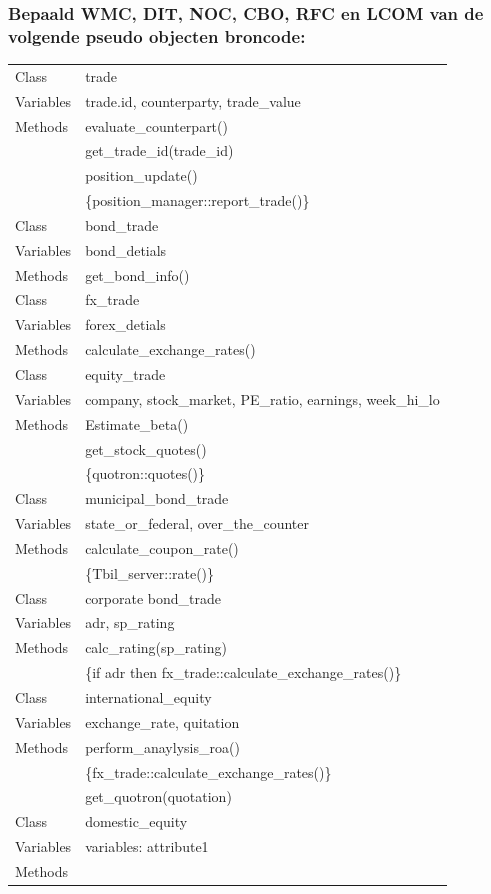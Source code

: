 \documentclass[a4paper,titlepage]{artikel1}
\begin{document}
   \subsubsection[Opdracht 2]{Bepaald WMC, DIT, NOC, CBO, RFC en LCOM van de volgende pseudo objecten broncode:}
   \begin{center}
   \begin{tabular}{|l|l|}
     \hline
     Class & trade \\
     Variables & trade.id, counterparty, trade\_value \\
     Methods & evaluate\_counterpart() \\
     & get\_trade\_id(trade\_id) \\
     & position\_update() \\
     & \{position\_manager::report\_trade()\} \\
     \hline
     Class & bond\_trade \\
     Variables & bond\_detials \\
     Methods & get\_bond\_info() \\
     \hline
     Class & fx\_trade \\
     Variables & forex\_detials \\
     Methods & calculate\_exchange\_rates() \\
     \hline
     Class & equity\_trade \\
     Variables & company, stock\_market, PE\_ratio,  earnings, week\_hi\_lo \\
     Methods & Estimate\_beta() \\
     & get\_stock\_quotes() \\
     & \{quotron::quotes()\} \\
     \hline
     Class &municipal\_bond\_trade \\
     Variables & state\_or\_federal, over\_the\_counter \\
     Methods & calculate\_coupon\_rate() \\
     & \{Tbil\_server::rate()\} \\
     \hline
     Class & corporate bond\_trade \\
     Variables & adr, sp\_rating \\
     Methods & calc\_rating(sp\_rating) \\
     & \{if adr then fx\_trade::calculate\_exchange\_rates()\} \\
     \hline
     Class & international\_equity \\
     Variables & exchange\_rate, quitation \\
     Methods & perform\_anaylysis\_roa()\\
     & \{fx\_trade::calculate\_exchange\_rates()\}\\
     & get\_quotron(quotation) \\
     \hline
     Class & domestic\_equity \\
     Variables & variables: attribute1\\
     Methods & \\
     \hline
   \end{tabular}
   \end{center}
\end{document}
